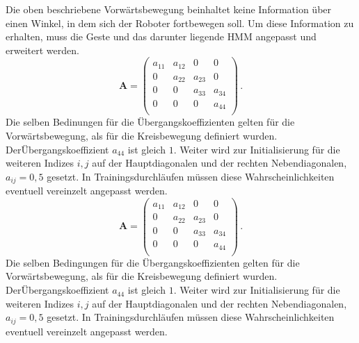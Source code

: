 Die oben beschriebene Vorw\"artsbewegung beinhaltet keine Information \"uber einen Winkel, in dem sich der Roboter fortbewegen soll. Um diese Information zu erhalten, muss die Geste und das darunter liegende \acrshort{HMM} angepasst und erweitert werden.
\newline
\begin{equation}
\mathbf{A} = 
\begin{pmatrix}
a_{11} & a_{12} & 0 & 0\\
0 & a_{22} & a_{23} & 0\\
0 & 0 & a_{33} & a_{34}\\
0 & 0 & 0 & a_{44} \\
\end{pmatrix} \, .
\end{equation}
Die selben Bedinungen f\"ur die \"Ubergangskoeffizienten gelten f\"ur die Vorw\"artsbewegung, als f\"ur die Kreisbewegung definiert wurden. 
\newline
Der\"Ubergangskoeffizient $a_{44}$ ist gleich $1$. Weiter wird zur Initialisierung f\"ur die weiteren Indizes $i, j$ auf der Hauptdiagonalen und der rechten Nebendiagonalen, $a_{ij} = 0,5$ gesetzt. In Trainingsdurchl\"aufen m\"ussen diese Wahrscheinlichkeiten eventuell vereinzelt angepasst werden.\begin{equation}
\mathbf{A} = 
\begin{pmatrix}
a_{11} & a_{12} & 0 & 0\\
0 & a_{22} & a_{23} & 0\\
0 & 0 & a_{33} & a_{34}\\
0 & 0 & 0 & a_{44} \\
\end{pmatrix} \, .
\end{equation}
Die selben Bedingungen f\"ur die \"Ubergangskoeffizienten gelten f\"ur die Vorw\"artsbewegung, als f\"ur die Kreisbewegung definiert wurden. 
\newline
Der\"Ubergangskoeffizient $a_{44}$ ist gleich $1$. Weiter wird zur Initialisierung f\"ur die weiteren Indizes $i, j$ auf der Hauptdiagonalen und der rechten Nebendiagonalen, $a_{ij} = 0,5$ gesetzt. In Trainingsdurchl\"aufen m\"ussen diese Wahrscheinlichkeiten eventuell vereinzelt angepasst werden.

